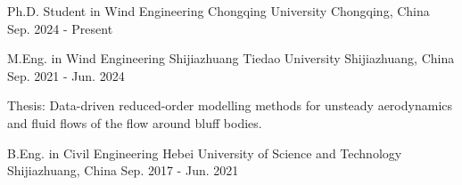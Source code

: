 
\begin{cventries}

  \cventry
    {Ph.D. Student in Wind Engineering}
    {Chongqing University}
    {Chongqing, China}
    {Sep. 2024 - Present}
    {}

  \cventry
    {M.Eng. in Wind Engineering}
    {Shijiazhuang Tiedao University}
    {Shijiazhuang, China}
    {Sep. 2021 - Jun. 2024}
    {
      \begin{cvitems}
        \item {Thesis: Data-driven reduced-order modelling methods for unsteady aerodynamics and fluid flows of the flow around bluff bodies.}
      \end{cvitems}
    }

  \cventry
    {B.Eng. in Civil Engineering}
    {Hebei University of Science and Technology}
    {Shijiazhuang, China}
    {Sep. 2017 - Jun. 2021}
    {}

\end{cventries}
